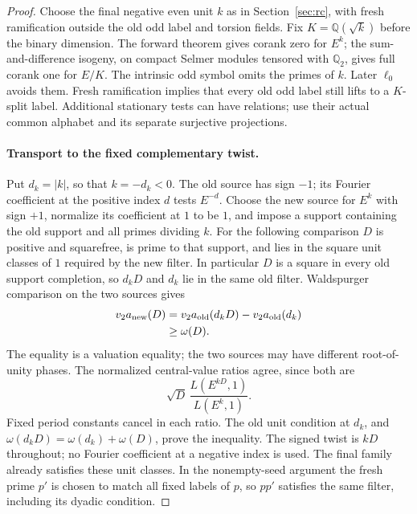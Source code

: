 \documentclass[11pt]{article}
\theoremstyle{definition}
\theoremstyle{remark}
\newcommand{\Q}{\mathbb Q}
\begin{document}
\begin{proof}\leavevmode
Choose the final negative even unit $k$ as in
Section~\ref{sec:rc}, with fresh ramification outside the old odd
label and torsion fields. Fix $K=\Q(\sqrt k)$ before the binary
dimension. The forward theorem gives corank zero for $E^k$;
the sum-and-difference isogeny, on compact Selmer modules tensored
with $\Q_2$, gives full corank one for $E/K$.
The intrinsic odd symbol omits the primes of $k$.
Later $\ell_0$ avoids them. Fresh ramification implies that every
old odd label still lifts to a $K$-split label.
Additional stationary tests can have relations; use their actual
common alphabet and its separate surjective projections.

\paragraph{Transport to the fixed complementary twist.}
Put $d_k=|k|$, so that $k=-d_k<0$. The old source has sign $-1$;
its Fourier coefficient at the positive index $d$ tests $E^{-d}$.
Choose the new source for $E^k$ with sign $+1$, normalize its
coefficient at $1$ to be $1$, and impose a support containing the
old support and all primes dividing $k$. For the following comparison
$D$ is positive and squarefree, is prime to that support, and lies
in the square unit classes of $1$ required by the new filter.
In particular $D$ is a square in every old support completion, so
$d_kD$ and $d_k$ lie in the same old filter. Waldspurger comparison
on the two sources gives
\[
 \begin{split}
  v_2 a_{\rm new}(D)
    &=v_2 a_{\rm old}(d_kD)-v_2 a_{\rm old}(d_k)\\
    &\ge \omega(D).
 \end{split}
\]
The equality is a valuation equality; the two sources may have
different root-of-unity phases. The normalized central-value ratios
agree, since both are
\[
 \sqrt D\,\frac{L(E^{kD},1)}{L(E^k,1)}.
\]
Fixed period constants cancel in each ratio. The old unit condition
at $d_k$, and $\omega(d_kD)=\omega(d_k)+\omega(D)$, prove the
inequality. The signed twist is $kD$ throughout; no Fourier
coefficient at a negative index is used. The final family already
satisfies these unit classes. In the nonempty-seed argument the
fresh prime $p'$ is chosen to match all fixed labels of $p$, so
$pp'$ satisfies the same filter, including its dyadic condition.


\end{proof}
\end{document}

